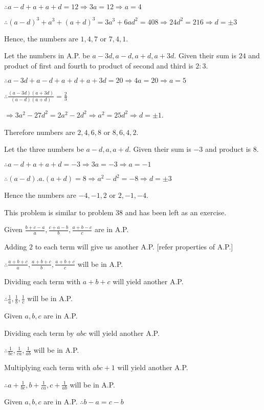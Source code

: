   $\therefore a - d + a + a + d = 12 \Rightarrow 3a = 12 \Rightarrow a = 4$

  $\therefore (a - d)^3 + a^3 + (a + d)^3 = 3a^3 + 6ad^2 = 408 \Rightarrow 24d^2 = 216 \Rightarrow d = \pm 3$

  Hence, the numbers are $1, 4, 7$ or $7, 4, 1$.
\item Let the numbers in A.P. be $a - 3d, a - d, a + d, a + 3d$. Given their sum is $24$ and product of first and
  fourth to product of second and third is $2:3$.

  $\therefore a - 3d + a - d + a + d + a + 3d = 20 \Rightarrow 4a = 20 \Rightarrow a = 5$

  $\therefore \frac{(a - 3d)(a + 3d)}{(a - d)(a + d)} = \frac{2}{3}$

  $\Rightarrow 3a^2 - 27d^2 = 2a^2 - 2d^2 \Rightarrow a^2 = 25d^2 \Rightarrow d = \pm1$.

  Therefore numbers are $2, 4, 6, 8$ or $8, 6, 4, 2$.
\item Let the three numbers be $a - d, a, a + d$. Given their sum is $-3$ and product is $8$.

  $\therefore a - d + a + a + d = -3 \Rightarrow 3a = -3 \Rightarrow a = -1$

  $\therefore (a - d).a.(a + d) = 8 \Rightarrow a^2 - d^2 = -8 \Rightarrow d = \pm3$

  Hence the numbers are $-4, -1, 2$ or $2, -1, -4$.
\item This problem is similar to problem 38 and has been left as an exercise.
\item Given $\frac{b + c - a}{a}, \frac{c + a - b}{b}, \frac{a + b - c}{c}$ are in A.P.

  Adding $2$ to each term will give us another A.P. [refer properties of A.P.]

  $\therefore \frac{a + b + c}{a}, \frac{a + b + c}{b}, \frac{a + b + c}{c}$ will be in A.P.

  Dividing each term with $a + b + c$ will yield another A.P.

  $\therefore \frac{1}{a}, \frac{1}{b}, \frac{1}{c}$ will be in A.P.
\item Given $a, b, c$ are in A.P.

  Dividing each term by $abc$ will yield another A.P.

  $\therefore \frac{1}{bc}, \frac{1}{ca}, \frac{1}{ab}$ will be in A.P.

  Multiplying each term with $abc + 1$ will yield another A.P.

  $\therefore a + \frac{1}{bc}, b + \frac{1}{ca}, c + \frac{1}{ab}$ will be in A.P.
\item Given $a, b, c$ are in A.P. $\therefore b - a = c - b$

